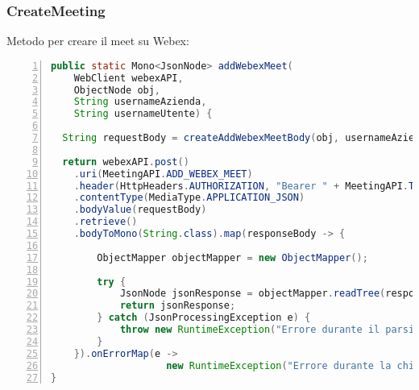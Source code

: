 \subsubsection{CreateMeeting}
Metodo per creare il meet su Webex:
\begin{lstlisting}[language=java, frame=lines, basicstyle=\ttfamily\scriptsize, numbers=left]
public static Mono<JsonNode> addWebexMeet(
    WebClient webexAPI, 
    ObjectNode obj, 
    String usernameAzienda,
    String usernameUtente) {

  String requestBody = createAddWebexMeetBody(obj, usernameAzienda, usernameUtente);

  return webexAPI.post()
    .uri(MeetingAPI.ADD_WEBEX_MEET)
    .header(HttpHeaders.AUTHORIZATION, "Bearer " + MeetingAPI.TOKEN)
    .contentType(MediaType.APPLICATION_JSON)
    .bodyValue(requestBody)
    .retrieve()
    .bodyToMono(String.class).map(responseBody -> {

        ObjectMapper objectMapper = new ObjectMapper();
            
        try {
            JsonNode jsonResponse = objectMapper.readTree(responseBody);
            return jsonResponse;
        } catch (JsonProcessingException e) {
            throw new RuntimeException("Errore durante il parsing della risposta JSON", e);
        }
    }).onErrorMap(e -> 
                    new RuntimeException("Errore durante la chiamata all'API di Webex", e));
}
\end{lstlisting}
